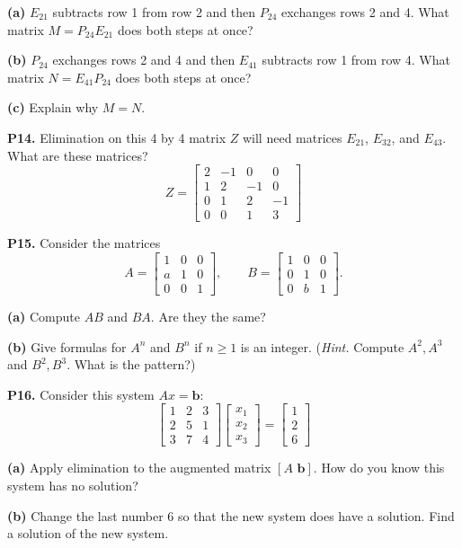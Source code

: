 \documentclass[12pt]{amsart}
\newcommand{\bb}{\bm{b}}
\newcommand{\prob}[1]{\bigskip\noindent\textbf{#1}\quad }
\newcommand{\epart}[1]{\medskip\noindent\textbf{(#1)}\quad }
\begin{document}
\epart{a} $E_{21}$ subtracts row 1 from row 2 and then $P_{24}$ exchanges rows 2 and 4.  What matrix $M=P_{24} E_{21}$ does both steps at once?

\epart{b} $P_{24}$ exchanges rows 2 and 4 and then $E_{41}$ subtracts row 1 from row 4. What matrix $N=E_{41} P_{24}$ does both steps at once?

\epart{c} Explain why $M=N$.

\prob{P14.}  Elimination on this 4 by 4 matrix $Z$ will need matrices $E_{21}$, $E_{32}$, and $E_{43}$.  What are these matrices?
    $$Z = \begin{bmatrix} 2 & -1 & 0 & 0 \\ 1 & 2 & -1 & 0 \\ 0 & 1 & 2 & -1 \\ 0 & 0 & 1 & 3 \end{bmatrix}$$

\prob{P15.}  Consider the matrices
    $$A = \begin{bmatrix} 1 & 0 & 0 \\ a & 1 & 0 \\ 0 & 0 & 1 \end{bmatrix}, \qquad B = \begin{bmatrix} 1 & 0 & 0 \\ 0 & 1 & 0 \\ 0 & b & 1 \end{bmatrix}.$$

\epart{a} Compute $AB$ and $BA$.  Are they the same?

\epart{b} Give formulas for $A^n$ and $B^n$ if $n\ge 1$ is an integer.  (\emph{Hint.} Compute $A^2,A^3$ and $B^2,B^3$.  What is the pattern?)

\prob{P16.}  Consider this system $Ax=\bb$:
    $$\begin{bmatrix} 1 & 2 & 3 \\ 2 & 5 & 1 \\ 3 & 7 & 4 \end{bmatrix} \begin{bmatrix} x_1 \\ x_2 \\ x_3 \end{bmatrix} = \begin{bmatrix} 1 \\ 2 \\ 6 \end{bmatrix}$$

\epart{a}  Apply elimination to the augmented matrix $\left[A\,\, \bb\right]$.  How do you know this system has no solution?

\epart{b}  Change the last number 6 so that the new system does have a solution.  Find a solution of the new system.
\end{document}
